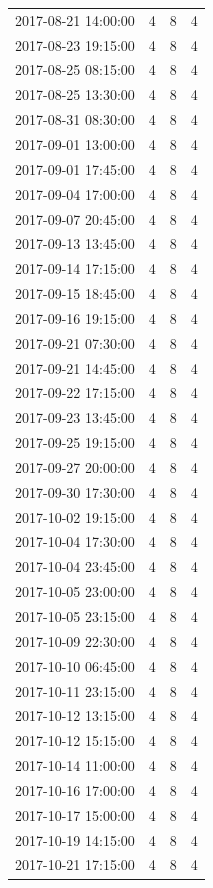\begin{tabular}{lrrr}
2017-08-21 14:00:00 & 4 & 8 & 4 \\
2017-08-23 19:15:00 & 4 & 8 & 4 \\
2017-08-25 08:15:00 & 4 & 8 & 4 \\
2017-08-25 13:30:00 & 4 & 8 & 4 \\
2017-08-31 08:30:00 & 4 & 8 & 4 \\
2017-09-01 13:00:00 & 4 & 8 & 4 \\
2017-09-01 17:45:00 & 4 & 8 & 4 \\
2017-09-04 17:00:00 & 4 & 8 & 4 \\
2017-09-07 20:45:00 & 4 & 8 & 4 \\
2017-09-13 13:45:00 & 4 & 8 & 4 \\
2017-09-14 17:15:00 & 4 & 8 & 4 \\
2017-09-15 18:45:00 & 4 & 8 & 4 \\
2017-09-16 19:15:00 & 4 & 8 & 4 \\
2017-09-21 07:30:00 & 4 & 8 & 4 \\
2017-09-21 14:45:00 & 4 & 8 & 4 \\
2017-09-22 17:15:00 & 4 & 8 & 4 \\
2017-09-23 13:45:00 & 4 & 8 & 4 \\
2017-09-25 19:15:00 & 4 & 8 & 4 \\
2017-09-27 20:00:00 & 4 & 8 & 4 \\
2017-09-30 17:30:00 & 4 & 8 & 4 \\
2017-10-02 19:15:00 & 4 & 8 & 4 \\
2017-10-04 17:30:00 & 4 & 8 & 4 \\
2017-10-04 23:45:00 & 4 & 8 & 4 \\
2017-10-05 23:00:00 & 4 & 8 & 4 \\
2017-10-05 23:15:00 & 4 & 8 & 4 \\
2017-10-09 22:30:00 & 4 & 8 & 4 \\
2017-10-10 06:45:00 & 4 & 8 & 4 \\
2017-10-11 23:15:00 & 4 & 8 & 4 \\
2017-10-12 13:15:00 & 4 & 8 & 4 \\
2017-10-12 15:15:00 & 4 & 8 & 4 \\
2017-10-14 11:00:00 & 4 & 8 & 4 \\
2017-10-16 17:00:00 & 4 & 8 & 4 \\
2017-10-17 15:00:00 & 4 & 8 & 4 \\
2017-10-19 14:15:00 & 4 & 8 & 4 \\
2017-10-21 17:15:00 & 4 & 8 & 4 \\

\end{tabular}

